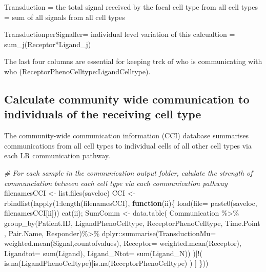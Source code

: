 \documentclass[
]{article}
\newenvironment{Shaded}{\begin{snugshade}}{\end{snugshade}}
\newcommand{\AttributeTok}[1]{\textcolor[rgb]{0.77,0.63,0.00}{#1}}
\newcommand{\CommentTok}[1]{\textcolor[rgb]{0.56,0.35,0.01}{\textit{#1}}}
\newcommand{\ControlFlowTok}[1]{\textcolor[rgb]{0.13,0.29,0.53}{\textbf{#1}}}
\newcommand{\DecValTok}[1]{\textcolor[rgb]{0.00,0.00,0.81}{#1}}
\newcommand{\FunctionTok}[1]{\textcolor[rgb]{0.00,0.00,0.00}{#1}}
\newcommand{\NormalTok}[1]{#1}
\newcommand{\OtherTok}[1]{\textcolor[rgb]{0.56,0.35,0.01}{#1}}
\newcommand{\SpecialCharTok}[1]{\textcolor[rgb]{0.00,0.00,0.00}{#1}}
\begin{document}
Transduction = the total signal received by the focal cell type from all
cell types = sum of all signals from all cell types

TransductionperSignaller= individual level variation of this calcualtion
= sum\_j(Receptor*Ligand\_j)

The last four columns are essential for keeping trck of who is
communicating with who (ReceptorPhenoCelltype:LigandCelltype).

\hypertarget{calculate-community-wide-communication-to-individuals-of-the-receiving-cell-type}{%
\subsection{Calculate community wide communication to individuals of the
receiving cell
type}\label{calculate-community-wide-communication-to-individuals-of-the-receiving-cell-type}}

The community-wide communication information (CCI) database summarises
communications from all cell types to individual cells of all other cell
types via each LR communication pathway.

\begin{Shaded}
\begin{Highlighting}[]
\CommentTok{\# For each sample in the communication output folder, calulate the strength of communciation between each cell type via each communication pathway}
\NormalTok{filenamesCCI }\OtherTok{\textless{}{-}} \FunctionTok{list.files}\NormalTok{(saveloc)}
\NormalTok{CCI }\OtherTok{\textless{}{-}} \FunctionTok{rbindlist}\NormalTok{(}\FunctionTok{lapply}\NormalTok{(}\DecValTok{1}\SpecialCharTok{:}\FunctionTok{length}\NormalTok{(filenamesCCI), }\ControlFlowTok{function}\NormalTok{(ii)\{}
  \FunctionTok{load}\NormalTok{(}\AttributeTok{file=} \FunctionTok{paste0}\NormalTok{(saveloc, filenamesCCI[ii]))}
  \FunctionTok{cat}\NormalTok{(ii);}
\NormalTok{  SumComm }\OtherTok{\textless{}{-}} \FunctionTok{data.table}\NormalTok{( Communication }\SpecialCharTok{\%\textgreater{}\%}
                           \FunctionTok{group\_by}\NormalTok{(Patient.ID, LigandPhenoCelltype, ReceptorPhenoCelltype,    Time.Point , Pair.Name, Responder)}\SpecialCharTok{\%\textgreater{}\%}
\NormalTok{                           dplyr}\SpecialCharTok{::}\FunctionTok{summarise}\NormalTok{(}\AttributeTok{TransductionMu=} \FunctionTok{weighted.mean}\NormalTok{(Signal,countofvalues),  }\AttributeTok{Receptor=} \FunctionTok{weighted.mean}\NormalTok{(Receptor), }\AttributeTok{Ligandtot=} \FunctionTok{sum}\NormalTok{(Ligand), }\AttributeTok{Ligand\_Ntot=} \FunctionTok{sum}\NormalTok{(Ligand\_N))  )[}\SpecialCharTok{!}\NormalTok{( }\FunctionTok{is.na}\NormalTok{(LigandPhenoCelltype)}\SpecialCharTok{|}\FunctionTok{is.na}\NormalTok{(ReceptorPhenoCelltype) ) ]}
\NormalTok{\}))}
\end{Highlighting}
\end{Shaded}
\end{document}
